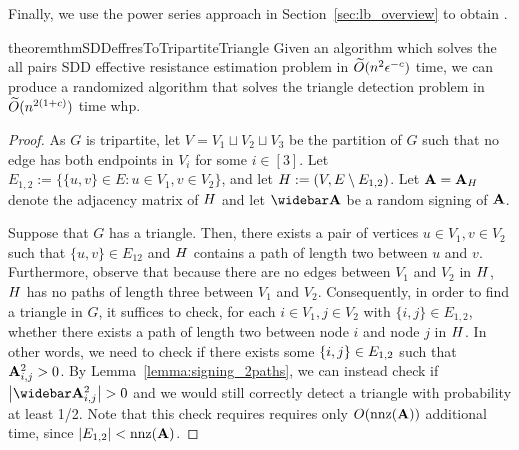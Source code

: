 Finally, we use the power series approach in Section~\ref{sec:lb_overview} to obtain .
\begin{restatable}{theorem}{thmSDDeffresToTripartiteTriangle} \label{theorem:sddeffres_hard_as_tridetect} Given an algorithm which solves the all pairs SDD effective resistance estimation problem in $\widetilde{O}( {n^2 \epsilon^{-c}} )$ time, we can produce a randomized algorithm that solves the triangle detection problem in $\widetilde{O}( {n^{2(1+c)}} )$ time whp. 
\end{restatable}
\begin{proof} As $G$ is tripartite, let $V = V_1 \sqcup V_2 \sqcup V_3$ be the partition of $G$ such that no edge has both endpoints in $V_i$ for some $i \in [3]$. Let $E_{1,2} := \{\{u, v\} \in E : u \in V_1, v \in V_2\}$, and let $H := (V, E\setminus{E_{1,2}})$. Let $\mathbf{A} = \mathbf{A}_{H}$ denote the adjacency matrix of $H$ and let $\As$ be a random signing of $\mathbf{A}$.

Suppose that $G$ has a triangle. Then, there exists a pair of vertices $u \in V_1, v \in V_2$ such that $\{u, v\} \in E_{12}$ and $H$ contains a path of length two between $u$ and $v$. Furthermore, observe that because there are no edges between $V_1$ and $V_2$ in $H$, $H$ has no paths of length three between $V_1$ and $V_2$. Consequently, in order to find a triangle in $G$, it suffices to check, for each $i \in V_1, j \in V_2$ with $\{i, j\} \in E_{1,2}$, whether there exists a path of length two between node $i$ and node $j$ in $H$. In other words, we need to check if there exists some $\left\{ i, j \right\} \in E_{1,2}$ such that $\mathbf{A}^2_{i,j} > 0$. By Lemma~\ref{lemma:signing_2paths}, we can instead check if $\abs{\As^2_{i,j}} > 0$ and we would still correctly detect a triangle with probability at least 1/2. Note that this check requires requires only $O(\mathrm{nnz}(\mathbf{A}))$ additional time, since $\left\lvert E_{1,2} \right\rvert < \mathrm{nnz}(\mathbf{A})$. 



\end{proof}
